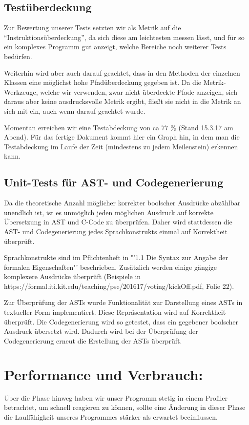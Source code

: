 \documentclass[a4paper]{scrreprt}
\begin{document}
\section{Testüberdeckung}
Zur Bewertung unserer Tests setzten wir als Metrik auf die
"`Instruktionsüberdeckung"', da sich diese am leichtesten messen lässt, und für
so ein komplexes Programm gut anzeigt, welche Bereiche noch weiterer Tests
bedürfen.

Weiterhin wird aber auch darauf geachtet, dass in den Methoden der einzelnen Klassen eine möglichst hohe
Pfadüberdeckung gegeben ist. Da die Metrik-Werkzeuge, welche wir verwenden, zwar
nicht überdeckte Pfade anzeigen, sich daraus aber keine ausdrucksvolle Metrik ergibt, fließt sie nicht in die Metrik an sich mit ein, auch wenn darauf
geachtet wurde.

Momentan erreichen wir eine Testabdeckung von ca 77 \% (Stand 15.3.17 am Abend).
Für das fertige Dokument kommt hier ein Graph hin, in dem man die Testabdeckung
im Laufe der Zeit (mindestens zu jedem Meilenstein) erkennen kann.

\section{Unit-Tests für AST- und Codegenerierung}
Da die theoretische Anzahl möglicher korrekter boolscher Ausdrücke abzählbar unendlich ist, ist es unmöglich jeden möglichen Ausdruck auf korrekte Übersetzung in AST und C-Code zu überprüfen. Daher wird stattdessen die AST- und Codegenerierung jedes Sprachkonstrukts einmal auf Korrektheit überprüft. 

Sprachkonstrukte sind im Pflichtenheft in "'1.1 Die Syntax zur Angabe der formalen Eigenschaften"' beschrieben. Zusätzlich werden einige gängige komplexere Ausdrücke überprüft (Beispiele in https://formal.iti.kit.edu/teaching/pse/201617/voting/kickOff.pdf, Folie 22). 

Zur Überprüfung der ASTs wurde Funktionalität zur Darstellung eines ASTs in textueller Form implementiert. Diese Repräsentation wird auf Korrektheit überprüft. Die Codegenerierung wird so getestet, dass ein gegebener boolscher Ausdruck übersetzt wird. Dadurch wird bei der Überprüfung der Codegenerierung erneut die Erstellung der ASTs überprüft. 

\chapter{Performance und Verbrauch:}
Über die Phase hinweg haben wir unser Programm stetig in einem Profiler betrachtet, um
schnell reagieren zu können, sollte eine Änderung in dieser Phase die
Lauffähigkeit unseres Programmes stärker als erwartet beeinflussen.
\end{document}
